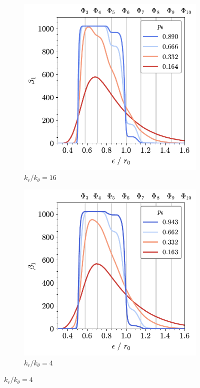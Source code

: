 \begin{figure}[tb]
	\centering
     
      \begin{subfigure}[b]{0.48\textwidth}
         \centering
         \includegraphics[width=\textwidth]{./figures/ph/bs_k16_beta1_cut.pdf}
         \caption{$k_r/k_\theta=16$}
         \label{fig:bsbettia}
     \end{subfigure}
     \hfill
     \begin{subfigure}[b]{0.48\textwidth}
         \centering
         \includegraphics[width=\textwidth]{./figures/ph/bs_k4_beta1_cut.pdf}
         \caption{$k_r/k_\theta=4$}
         \label{fig:bsbettib}
     \end{subfigure}


\end{figure}
